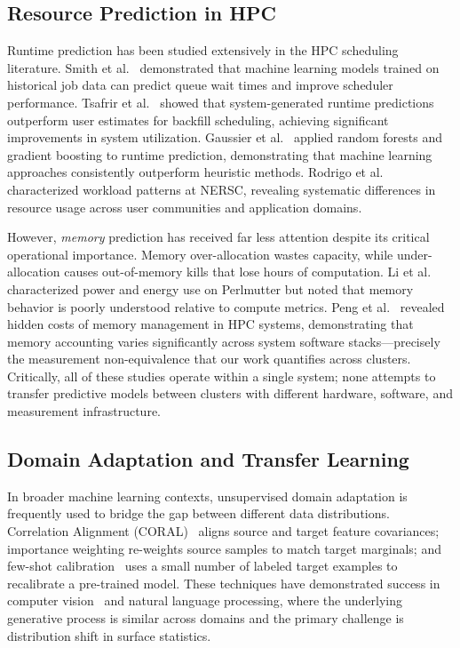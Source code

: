 \documentclass[sigconf]{acmart}
\begin{document}
\subsection{Resource Prediction in HPC}

Runtime prediction has been studied extensively in the HPC scheduling literature.
Smith et al.~\cite{smith1998runtime} demonstrated that machine learning models trained on historical job data can predict queue wait times and improve scheduler performance.
Tsafrir et al.~\cite{tsafrir2007backfilling} showed that system-generated runtime predictions outperform user estimates for backfill scheduling, achieving significant improvements in system utilization.
Gaussier et al.~\cite{gaussier2015backfilling} applied random forests and gradient boosting to runtime prediction, demonstrating that machine learning approaches consistently outperform heuristic methods.
Rodrigo et al.~\cite{rodrigo2018enabling} characterized workload patterns at NERSC, revealing systematic differences in resource usage across user communities and application domains.

However, \emph{memory} prediction has received far less attention despite its critical operational importance.
Memory over-allocation wastes capacity, while under-allocation causes out-of-memory kills that lose hours of computation.
Li et al.~\cite{li2023perlmutter} characterized power and energy use on Perlmutter but noted that memory behavior is poorly understood relative to compute metrics.
Peng et al.~\cite{peng2022memory} revealed hidden costs of memory management in HPC systems, demonstrating that memory accounting varies significantly across system software stacks---precisely the measurement non-equivalence that our work quantifies across clusters.
Critically, all of these studies operate within a single system; none attempts to transfer predictive models between clusters with different hardware, software, and measurement infrastructure.

\subsection{Domain Adaptation and Transfer Learning}

In broader machine learning contexts, unsupervised domain adaptation is frequently used to bridge the gap between different data distributions.
Correlation Alignment (CORAL)~\cite{coral_2016} aligns source and target feature covariances; importance weighting re-weights source samples to match target marginals; and few-shot calibration~\cite{few_shot_survey_2020} uses a small number of labeled target examples to recalibrate a pre-trained model.
These techniques have demonstrated success in computer vision~\cite{domain_adaptation_survey_2021} and natural language processing, where the underlying generative process is similar across domains and the primary challenge is distribution shift in surface statistics.
\end{document}
